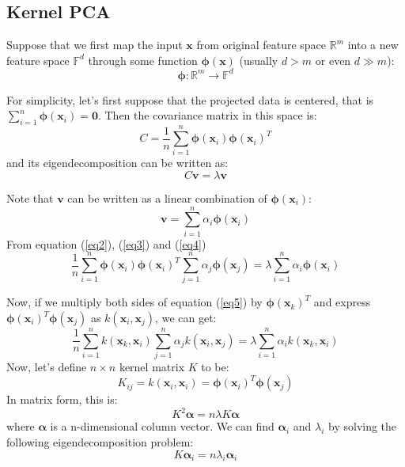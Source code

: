 \documentclass[tikz, multi,dvipsnames,svgnames,x11names]{article}
\begin{document}
\subsection{Kernel PCA}
\label{kernelPCA}

Suppose that we first map the input $\bm{x}$ from original feature space $\mathbb{R}^m$ into a new feature space $\mathbb{F}^d$ through some function $\bm{\phi(\bm{x})}$ (usually $d > m$ or even $d \gg m$):
\begin{equation}
\label{eq1}
\bm{\phi}: \mathbb{R}^m \rightarrow \mathbb{F}^d
\end{equation}

For simplicity, let's first suppose that the projected data is centered, that is $\sum_{i=1}^n \bm{\phi}(\bm{x}_i)=\bm 0$. Then the covariance matrix in this space is:
\begin{equation}
\label{eq2}
C = \frac{1}{n} \sum_{i=1}^n \bm{\phi}(\bm{x}_i) \bm{\phi}(\bm{x}_i)^T
\end{equation}
and its eigendecomposition can be written as:
\begin{equation}
\label{eq3}
C\bm{v} = \lambda \bm{v}
\end{equation}

Note that $\bm v$ can be written as a linear combination of $\bm{\phi}(\bm{x}_i)$:
\begin{equation}
\label{eq4}
\bm{v} = \sum_{i=1}^n \alpha_i \bm{\phi}(\bm{x}_i)
\end{equation}
From equation (\ref{eq2}), (\ref{eq3}) and (\ref{eq4}) 
\begin{equation}
\label{eq5}
\frac{1}{n} \sum_{i=1}^n \bm{\phi}(\bm{x}_i) \bm{\phi}(\bm{x}_i)^T  \sum_{j=1}^n \alpha_j \bm{\phi}(\bm{x}_j) = \lambda \sum_{i=1}^n \alpha_i \bm{\phi}(\bm{x}_i)
\end{equation}

Now, if we multiply both sides of equation (\ref{eq5}) by $\bm{\phi}(\bm{x}_k)^T$ and express $\bm{\phi}(\bm{x}_i)^T \bm{\phi}(\bm{x}_j)$ as $k(\bm{x}_i, \bm{x}_j)$, we can get:
\begin{equation}
\label{eq6}
\frac{1}{n} \sum_{i=1}^n k(\bm{x}_k, \bm{x}_i) \sum_{j=1}^n \alpha_j k(\bm{x}_i, \bm{x}_j) = \lambda \sum_{i=1}^n \alpha_i k(\bm{x}_k, \bm{x}_i)
\end{equation}
Now, let's define $n \times n$ kernel matrix $K$ to be:
\begin{equation}
\label{eq7}
K_{ij} = k(\bm{x}_i, \bm{x}_i) = \bm{\phi}(\bm{x}_i)^T \bm{\phi}(\bm{x}_j)
\end{equation}	
In matrix form, this is:
\begin{equation}
\label{eq8}
K^2 \bm{\alpha} = n\lambda K \bm{\alpha}
\end{equation}
where $\bm{\alpha}$ is a n-dimensional column vector. We can find $\bm{\alpha}_i$ and $\lambda_i$ by solving the following eigendecomposition problem:
\begin{equation}
\label{eq9}
K \bm{\alpha}_i = n\lambda_i \bm{\alpha}_i
\end{equation}
\end{document}
